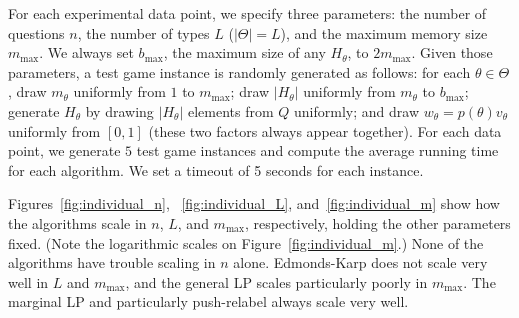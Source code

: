 \documentclass{article}
\begin{document}
For each experimental data point, we specify three parameters:
the number of questions $n$, the number of types $L$ ($|\Theta| = L$), and the maximum
memory size $m_{\text{max}}$.  We always set $b_\text{max}$, the maximum
size of any $H_\theta$, to $2m_{\text{max}}$.
Given those
parameters, a test game instance is randomly generated as follows: for each
$\theta \in \Theta$, draw $m_\theta$ uniformly from $1$ to $m_{\text{max}}$; draw $|H_\theta|$
uniformly from $m_\theta$ to $b_{\text{max}}$;
generate $H_\theta$ by drawing $|H_\theta|$
elements from $Q$ uniformly; and draw $w_\theta = p(\theta)v_\theta$ 
uniformly 
from $[0,1]$ (these two factors always appear together).
For each data point,
we generate $5$ test game instances and compute the average running time
for each algorithm.  We set a timeout of 5 seconds for each instance.




Figures~\ref{fig:individual_n},~ \ref{fig:individual_L},
and~\ref{fig:individual_m}  show how the algorithms scale in $n$, $L$, and
$m_\text{max}$, respectively, holding the other parameters fixed.  
(Note the logarithmic scales on Figure~\ref{fig:individual_m}.)
None of the algorithms have trouble scaling in $n$ alone.
 Edmonds-Karp does not scale very well in $L$ and
$m_\text{max}$, and the general LP scales particularly poorly in
$m_\text{max}$.
The marginal LP and particularly push-relabel always scale very well.

%
%
\end{document}
